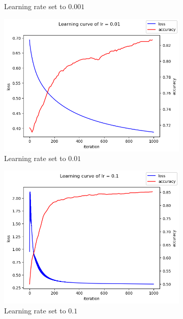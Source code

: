\documentclass [a4paper, 11pt] {article}
\begin{document}
\begin{enumerate}
\begin{figure}[!h]
\begin{subfigure}{0.4\textwidth}
		\caption{Learning rate set to $0.001$}
		\label{fig:2b}
	\end{subfigure}
	\begin{subfigure}{0.4\textwidth}
		\centering
		\includegraphics[width=\textwidth]{img/2_1_e_0-01.png}
		\caption{Learning rate set to $0.01$}
		\label{fig:2c}
	\end{subfigure}
	\begin{subfigure}{0.4\textwidth}
		\centering
		\includegraphics[width=\textwidth]{img/2_1_e_0-1.png}
		\caption{Learning rate set to $0.1$}
		\label{fig:2d}
	\end{subfigure}
	\begin{subfigure}{0.4\textwidth}
		\centering

\end{subfigure}
\end{figure}
\end{enumerate}
\end{document}
